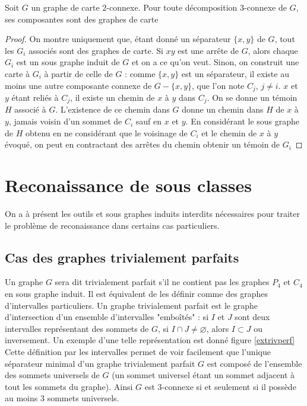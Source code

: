 \documentclass{scrartcl}
\begin{document}
\begin{flushleft}
\begin{prop}\label{3connCompCarte}
    Soit $G$ un graphe de carte $2$-connexe. Pour toute décomposition $3$-connexe de $G$, ses composantes sont des graphes de carte
\end{prop}

\begin{proof}
    On montre uniquement que, étant donné un séparateur $\{x,y\}$ de $G$, tout les $G_i$ associés sont des graphes de carte.
    Si $xy$ est une arrête de $G$, alors chaque $G_i$ est un sous graphe induit de $G$ et on a ce qu'on veut. Sinon, on construit une
    carte à $G_i$ à partir de celle de $G$ : comme $\{x,y\}$ est un séparateur, il existe au moins une autre composante connexe de
    $G - \{x,y\}$, que l'on note $C_j$, $j \neq i$. $x$ et $y$ étant reliés à $C_j$, il existe un chemin de $x$ à $y$ dans $C_j$.
    On se donne un témoin $H$ associé à $G$. L'existence de ce chemin dans $G$ donne un chemin dans $H$ de $x$ à $y$, jamais voisin
    d'un sommet de $C_i$ sauf en $x$ et $y$. En considérant le sous graphe de $H$ obtenu en ne considérant que le voisinage de $C_i$ et le chemin
    de $x$ à $y$ évoqué, on peut en contractant des arrêtes du chemin obtenir un témoin de $G_i$
\end{proof}

\section{Reconaissance de sous classes}

On a à présent les outils et sous graphes induits interdits nécessaires pour traiter le problème de reconaissance dans certains cas
particuliers.

\subsection{Cas des graphes trivialement parfaits}

Un graphe $G$ sera dit trivialement parfait s'il ne contient pas les graphes $P_4$ et $C_4$ en sous graphe induit.
Il est équivalent de les définir comme des graphes d'intervalles particuliers. Un graphe trivialement parfait est le graphe
d'intersection d'un ensemble d'intervalles "emboîtés" : si $I$ et $J$ sont deux intervalles représentant des sommets de $G$,
si $I \cap J \neq \varnothing$, alors $I \subset J$ ou inversement. Un exemple d'une telle représentation est donné figure
\ref{extrivperf}\\
Cette définition par les intervalles permet de voir facilement que l'unique séparateur minimal d'un graphe trivialement parfait $G$ est
composé de l'ensemble des sommets universels de $G$ (un sommet universel étant un sommet adjacent à tout les sommets du graphe). Ainsi
$G$ est $3$-connexe si et seulement si il possède au moins $3$ sommets universels.


\end{flushleft}
\end{document}

